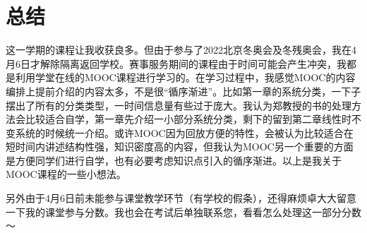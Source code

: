 \section{总结}

这一学期的课程让我收获良多。但由于参与了2022北京冬奥会及冬残奥会，我在4月6日才解除隔离返回学校。赛事服务期间的课程由于时间可能会产生冲突，我都是利用学堂在线的MOOC课程进行学习的。在学习过程中，我感觉MOOC的内容编排上提前介绍的内容太多，不是很“循序渐进”。比如第一章的系统分类，一下子摆出了所有的分类类型，一时间信息量有些过于庞大。我认为郑教授的书的处理方法会比较适合自学，第一章先介绍一小部分系统分类，剩下的留到第二章线性时不变系统的时候统一介绍。或许MOOC因为回放方便的特性，会被认为比较适合在短时间内讲述结构性强，知识密度高的内容，但我认为MOOC另一个重要的方面是方便同学们进行自学，也有必要考虑知识点引入的循序渐进。以上是我关于MOOC课程的一些小想法。

另外由于4月6日前未能参与课堂教学环节（有学校的假条），还得麻烦卓大大留意一下我的课堂参与分数。我也会在考试后单独联系您，看看怎么处理这一部分分数～